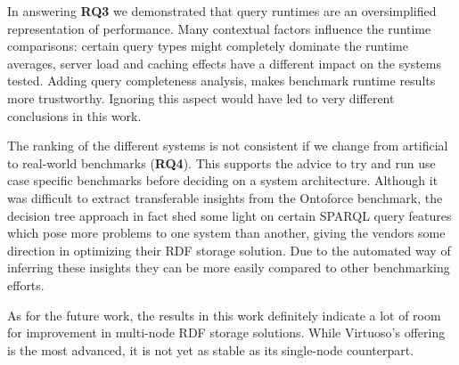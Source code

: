 In answering \textbf{RQ3} we demonstrated that query runtimes are an oversimplified representation of performance. Many contextual factors influence the runtime comparisons: certain query types might completely dominate the runtime averages, server load and caching effects have a different impact on the systems tested. Adding query completeness analysis, makes benchmark runtime results more trustworthy. Ignoring this aspect would have led to very different conclusions in this work.

The ranking of the different systems is not consistent if we change from artificial to real-world benchmarks (\textbf{RQ4}). This supports the advice to try and run use case specific benchmarks before deciding on a system architecture. Although it was difficult to extract transferable insights from the Ontoforce benchmark, the decision tree approach in fact shed some light on certain SPARQL query features which pose more problems to one system than another, giving the vendors some direction in optimizing their RDF storage solution. Due to the automated way of inferring these insights they can be more easily compared to other benchmarking efforts.

As for the future work, the results in this work definitely indicate a lot of room for improvement in multi-node RDF storage solutions. While Virtuoso's offering is the most advanced, it is not yet as stable as its single-node counterpart. 


%


